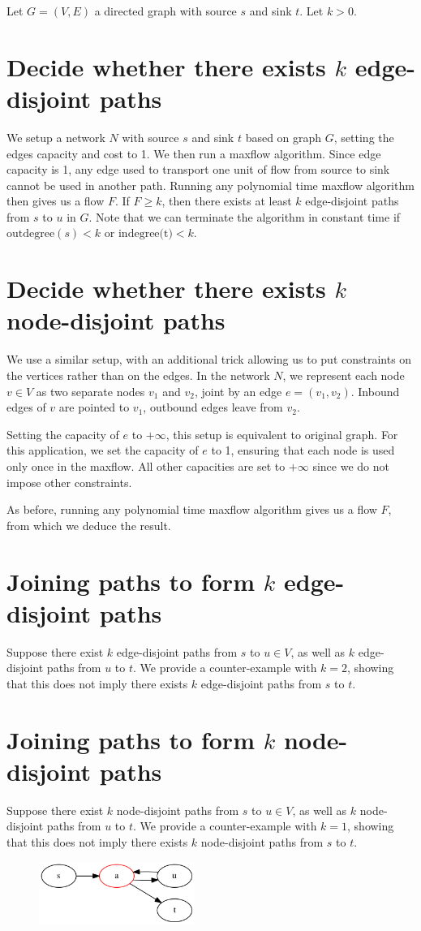 Let $G = (V, E)$ a directed graph with source $s$ and sink $t$. Let $k > 0$.


\section{Decide whether there exists $k$ \textbf{edge}-disjoint paths}
We setup a network $N$ with source $s$ and sink $t$ based on graph $G$, setting the edges capacity and cost to 1. We then run a maxflow algorithm. Since edge capacity is 1, any edge used to transport one unit of flow from source to sink cannot be used in another path. Running any polynomial time maxflow algorithm then gives us a flow $F$. If $F \geq k$, then there exists at least $k$ edge-disjoint paths from $s$ to $u$ in $G$. Note that we can terminate the algorithm in constant time if $\text{outdegree}(s) < k$ or $\text{indegree(t)} < k$.

\section{Decide whether there exists $k$ \textbf{node}-disjoint paths}
We use a similar setup, with an additional trick allowing us to put constraints on the vertices rather than on the edges. In the network $N$, we represent each node $v \in V$ as two separate nodes $v_1$ and $v_2$, joint by an edge $e = (v_1, v_2)$. Inbound edges of $v$ are pointed to $v_1$, outbound edges leave from $v_2$.

Setting the capacity of $e$ to $+\infty$, this setup is equivalent to original graph. For this application, we set the capacity of $e$ to 1, ensuring that each node is used only once in the maxflow. All other capacities are set to $+\infty$ since we do not impose other constraints.

As before, running any polynomial time maxflow algorithm gives us a flow $F$, from which we deduce the result.

\section{Joining paths to form $k$ \textbf{edge}-disjoint paths}
Suppose there exist $k$ edge-disjoint paths from $s$ to $u \in V$, as well as $k$ edge-disjoint paths from $u$ to $t$. We provide a counter-example with $k = 2$, showing that this does not imply there exists $k$ edge-disjoint paths from $s$ to $t$.



\section{Joining paths to form $k$ \textbf{node}-disjoint paths}
Suppose there exist $k$ node-disjoint paths from $s$ to $u \in V$, as well as $k$ node-disjoint paths from $u$ to $t$. We provide a counter-example with $k = 1$, showing that this does not imply there exists $k$ node-disjoint paths from $s$ to $t$.

\begin{figure}[ht]
  \center
  \includegraphics[width=2in]{figures/3-4-graph.png}
\end{figure}

